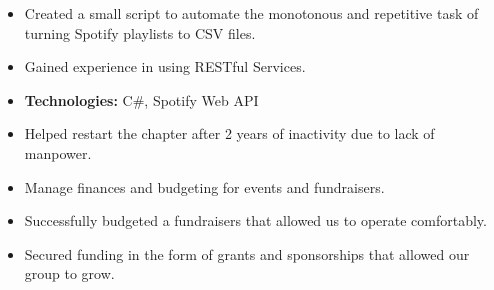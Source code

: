 \documentclass[10pt,a4paper,ragged2e,academicons,withhyper]{altacv}
\begin{document}
\begin{paracol}{2}
  \begin{itemize}
    \item Created a small script to automate the monotonous and repetitive task of turning Spotify playlists to CSV files.
    \item Gained experience in using RESTful Services.
    \item \textbf{Technologies:} C\#, Spotify Web API
  \end{itemize}
  \divider\small

  \nocite{*}

  \switchcolumn






  \begin{itemize}
    \item Helped restart the chapter after 2 years of inactivity due to lack of manpower.
    \item Manage finances and budgeting for events and fundraisers.
    \item Successfully budgeted a fundraisers that allowed us to operate comfortably.
    \item Secured funding in the form of grants and sponsorships that allowed our group to grow.
  \end{itemize}
  \divider\small


\end{paracol}
\end{document}
